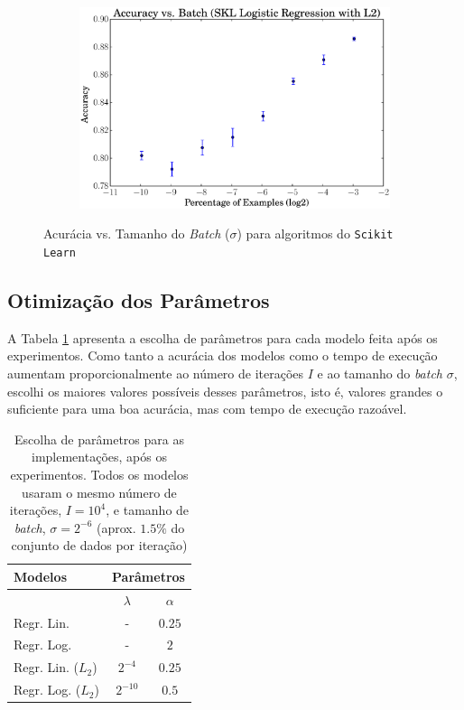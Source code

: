 \documentclass[a4paper, 12pt]{article}
\begin{document}
\begin{figure}[htpb]
\begin{subfigure}[htpb]{0.45\textwidth}
        \includegraphics[width=\textwidth]{acc_vs_batchp_skl_logregL2}
        \caption{}
        \label{fig:batch_skl_logregL2}
    \end{subfigure}
    \caption{Acurácia vs. Tamanho do \textit{Batch} ($\sigma$)
    para algoritmos do \texttt{Scikit Learn}}\label{fig:batch_skl}
\end{figure}

\newpage
\subsection{Otimização dos Parâmetros}

A Tabela \ref{tab:par} apresenta a escolha de parâmetros para cada modelo feita
após os experimentos.  Como tanto a acurácia dos modelos como o tempo de
execução aumentam proporcionalmente ao número de iterações $I$ e ao tamanho do
\textit{batch} $\sigma$, escolhi os maiores valores possíveis desses
parâmetros, isto é, valores grandes o suficiente para uma boa acurácia, mas
com tempo de execução razoável.

\begin{table}[htpb]
    \centering
    \begin{tabular}{@{}lcc@{}}
        \textbf{Modelos} & \multicolumn{2}{c}{\textbf{Parâmetros}} \\ \toprule
        & $\lambda$ & $\alpha$ \\ \midrule
        Regr. Lin. & - & $0.25$ \\
        Regr. Log. & - & $2$ \\
        Regr. Lin. ($L_2$) & $2^{-4}$ & $0.25 $       \\
        Regr. Log. ($L_2$) & $2^{-10}$ & $0.5$ \\ \bottomrule
    \end{tabular}
    \caption{Escolha de parâmetros para as implementações, após os
    experimentos. Todos os modelos usaram o mesmo número de iterações,
    $I = 10^{4}$, e tamanho de \textit{batch}, $\sigma = 2^{-6}$ (aprox.
    $1.5\%$ do conjunto de dados por iteração)}
    \label{tab:par}
\end{table}
\end{document}
